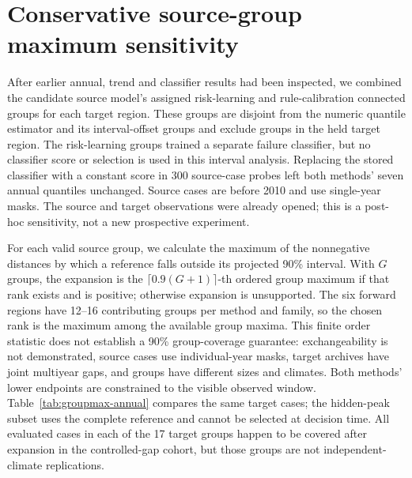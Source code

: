 \section{Conservative source-group maximum sensitivity}
After earlier annual, trend and classifier results had been inspected, we combined the candidate source model's assigned risk-learning and rule-calibration connected groups for each target region. These groups are disjoint from the numeric quantile estimator and its interval-offset groups and exclude groups in the held target region. The risk-learning groups trained a separate failure classifier, but no classifier score or selection is used in this interval analysis. Replacing the stored classifier with a constant score in 300 source-case probes left both methods' seven annual quantiles unchanged. Source cases are before 2010 and use single-year masks. The source and target observations were already opened; this is a post-hoc sensitivity, not a new prospective experiment.

For each valid source group, we calculate the maximum of the nonnegative distances by which a reference falls outside its projected 90\% interval. With $G$ groups, the expansion is the $\lceil0.9(G+1)\rceil$-th ordered group maximum if that rank exists and is positive; otherwise expansion is unsupported. The six forward regions have 12--16 contributing groups per method and family, so the chosen rank is the maximum among the available group maxima. This finite order statistic does not establish a 90\% group-coverage guarantee: exchangeability is not demonstrated, source cases use individual-year masks, target archives have joint multiyear gaps, and groups have different sizes and climates. Both methods' lower endpoints are constrained to the visible observed window. Table~\ref{tab:groupmax-annual} compares the same target cases; the hidden-peak subset uses the complete reference and cannot be selected at decision time. All evaluated cases in each of the 17 target groups happen to be covered after expansion in the controlled-gap cohort, but those groups are not independent-climate replications.

\begin{table}[ht]\caption{Nominal 90\% annual intervals in common forward controlled-gap cases, baseline / source-group-maximum expansion. Width and interval score are $^{\circ}$C; lower score is better.}\label{tab:groupmax-annual}\centering\small
{}\end{table}

